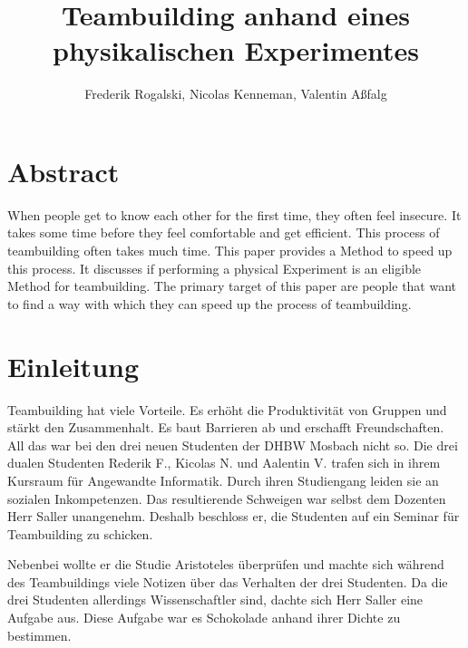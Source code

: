\documentclass[12pt]{scrartcl}
\title{Teambuilding anhand eines physikalischen Experimentes}
\author{Frederik Rogalski, Nicolas Kenneman, Valentin Aßfalg}
\begin{document}
\maketitle

\section{Abstract}
When people get to know each other for the first time, they often feel insecure. It takes some time before they feel comfortable and get efficient. This process of teambuilding often takes much time. This paper provides a Method to speed up this process. It discusses if performing a physical Experiment is an eligible Method for teambuilding. The primary target of this paper are people that want to find a way with which they can speed up the process of teambuilding.

\section{Einleitung}
Teambuilding hat viele Vorteile. Es erhöht die Produktivität von Gruppen und stärkt den Zusammenhalt. Es baut Barrieren ab und erschafft Freundschaften. All das war bei den drei neuen Studenten der DHBW Mosbach nicht so. Die drei dualen Studenten Rederik F., Kicolas N. und Aalentin V. trafen sich in ihrem Kursraum für Angewandte Informatik. Durch ihren Studiengang leiden sie an sozialen Inkompetenzen. Das resultierende Schweigen war selbst dem Dozenten Herr Saller unangenehm. Deshalb beschloss er, die Studenten auf ein Seminar für Teambuilding zu schicken. 

Nebenbei wollte er die Studie Aristoteles \cite{Aristoteles} überprüfen und machte sich während des Teambuildings viele Notizen über das Verhalten der drei Studenten. Da die drei Studenten allerdings Wissenschaftler sind, dachte sich Herr Saller eine Aufgabe aus. Diese Aufgabe war es Schokolade anhand ihrer Dichte zu bestimmen.
\end{document}
